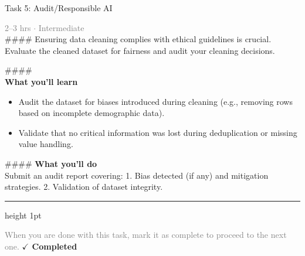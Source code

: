 \documentclass[10pt,a4paper]{article}
\begin{document}
\begin{taskbox}{Task 5: Audit/Responsible AI}

    {\small \textcolor{gray}{2--3 hrs $\cdot$ Intermediate}}\\[12pt]

    \#\#\#\#   
Ensuring data cleaning complies with ethical guidelines is crucial. Evaluate the cleaned dataset for fairness and audit your cleaning decisions.  

\#\#\#\# \\[10pt]
\vspace{8pt}
{\large \textbf{\textcolor{brandLight}{What you'll learn}}}\\[4pt]  
\begin{itemize}
    \item Audit the dataset for biases introduced during cleaning (e.g., removing rows based on incomplete demographic data).  
    \item Validate that no critical information was lost during deduplication or missing value handling.  
\end{itemize}

\#\#\#\# \vspace{8pt}
{\large \textbf{\textcolor{brandLight}{What you'll do}}}\\[4pt]  
Submit an audit report covering:  
1. Bias detected (if any) and mitigation strategies.  
2. Validation of dataset integrity.\par

    \vspace{16pt}

    \textcolor{cardBorder}{\hrule height 1pt}\vspace{8pt}

    \small \textcolor{gray}{When you are done with this task, mark it as complete to proceed to the next one.} \hfill \textbf{\textcolor{brandDark}{$\checkmark$ Completed}}

\end{taskbox}
\end{document}
